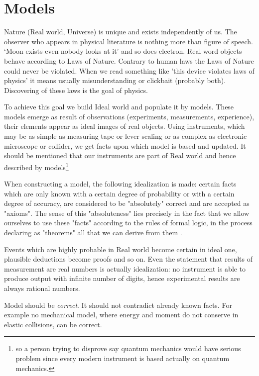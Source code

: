 \section{Models}
\label{models}

Nature (Real world, Universe) is unique and exists independently of us. The observer who appears in physical
literature is nothing more than figure of speech. `Moon exists even nobody looks at it' and so does electron.
Real word objects behave according to Laws of Nature. Contrary to human laws the Laws of Nature could never be violated.
When we read something like 'this device violates laws of physics' it means usually misunderstanding or clickbait (probably both). Discovering of these laws is the goal of physics. 

To achieve this goal
we build Ideal world and populate it by models. These models emerge as result of  observations (experiments, measurements, experience), 
their elements appear as ideal images of real objects. Using instruments, 
which may be as simple as measuring tape or lever scaling or as complex as electronic microscope or collider,
we get facts upon which model is based and updated.
It should be mentioned that our instruments are part of Real world  and hence described by models\footnote{so a person trying 
to disprove say quantum mechanics would have serious problem since every modern instrument is based actually on quantum 
mechanics.}

    When constructing a model, the following idealization is
   made: certain facts which are only known with a certain degree of
   probability or with a certain degree of accuracy, are considered to be
   "absolutely" correct and are accepted as "axioms". The sense of this
   "absoluteness" lies precisely in the fact that we allow ourselves to
   use these "facts" according to the rules of formal logic, in the
   process declaring as "theorems" all that we can derive from them \cite{Arnold-mt}.

   Events which are  highly probable in Real world become certain in ideal one, plausible deductions become proofs  and so on. Even the statement that results of measurement are real numbers is actually idealization: no instrument is able to produce output with infinite number of digits, hence experimental results are always rational numbers.

Model should be {\em correct}. It should not contradict already known facts. For example no
mechanical model, where energy and moment do not conserve in elastic collisions, can
be correct.

